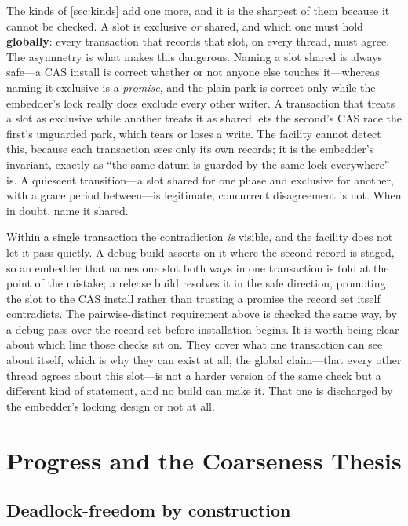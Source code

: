 \documentclass[11pt]{article}
\begin{document}
The kinds of \cref{sec:kinds} add one more, and it is the sharpest of them
because it cannot be checked. A slot is exclusive \emph{or} shared, and which one
must hold \textbf{globally}: every transaction that records that slot, on every
thread, must agree. The asymmetry is what makes this dangerous. Naming a slot
shared is always safe---a CAS install is correct whether or not anyone else
touches it---whereas naming it exclusive is a \emph{promise}, and the plain park
is correct only while the embedder's lock really does exclude every other writer.
A transaction that treats a slot as exclusive while another treats it as shared
lets the second's CAS race the first's unguarded park, which tears or loses a
write. The facility cannot detect this, because each transaction sees only its
own records; it is the embedder's invariant, exactly as ``the same datum is
guarded by the same lock everywhere'' is. A quiescent transition---a slot shared
for one phase and exclusive for another, with a grace period between---is
legitimate; concurrent disagreement is not. When in doubt, name it shared.

Within a single transaction the contradiction \emph{is} visible, and the facility
does not let it pass quietly. A debug build asserts on it where the second record
is staged, so an embedder that names one slot both ways in one transaction is
told at the point of the mistake; a release build resolves it in the safe
direction, promoting the slot to the CAS install rather than trusting a promise
the record set itself contradicts. The pairwise-distinct requirement above is
checked the same way, by a debug pass over the record set before installation
begins. It is worth being clear about which line those checks sit on. They cover
what one transaction can see about itself, which is why they can exist at all;
the global claim---that every other thread agrees about this slot---is not a
harder version of the same check but a different kind of statement, and no build
can make it. That one is discharged by the embedder's locking design or not at
all.

\section{Progress and the Coarseness Thesis}
\label{sec:progress}

\subsection{Deadlock-freedom by construction}
\label{sec:deadlock}
\end{document}
